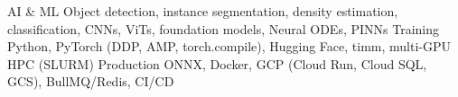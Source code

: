 \begin{cvskills}
  \cvskill
    {AI \& ML}
    {Object detection, instance segmentation, density estimation, classification, CNNs, ViTs, foundation models, Neural ODEs, PINNs}
  \cvskill
    {Training}
    {Python, PyTorch (DDP, AMP, torch.compile), Hugging Face, timm, multi-GPU HPC (SLURM)}
  \cvskill
    {Production}
    {ONNX, Docker, GCP (Cloud Run, Cloud SQL, GCS), BullMQ/Redis, CI/CD}
\end{cvskills}
